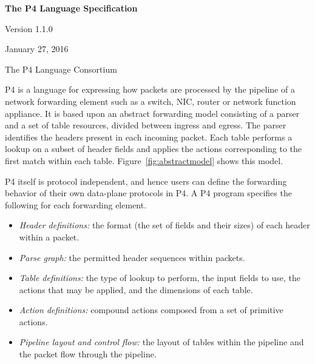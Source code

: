 \documentclass[12pt]{article}
\begin{document}
\vspace{2cm}

\centerline{\sffamily\bfseries\huge The P4 Language Specification}
\vspace{3mm}
\centerline{\sffamily\Large Version 1.1.0}
\vspace{3mm}
\centerline{\sffamily\large January 27, 2016}
\vspace{8mm}
\centerline{\sffamily\large The P4 Language Consortium}

\date{January 27, 2016}
\thispagestyle{firstpagestyle}
\newpage

\tableofcontents
\newpage


P4 is a language for expressing how packets are processed by the 
pipeline of a network forwarding element such as a switch, NIC, router or 
network function appliance. It is based upon an abstract forwarding model 
consisting of a parser and a set of \matchaction table resources, divided 
between ingress and egress. The parser identifies the headers present in 
each incoming packet. Each \matchaction table performs a lookup on a subset 
of header fields and applies the actions corresponding to the first match 
within each table. Figure~\ref{fig:abstractmodel} shows this model.

P4 itself is protocol independent, and hence users can define the forwarding
behavior of their own data-plane protocols in P4.
A P4 program specifies the following for each forwarding 
element.

\begin{itemize}
\item
\textit{Header definitions:} the format (the set of fields and their
sizes) of each header within a packet.
\item
\textit{Parse graph:} the permitted header sequences within packets.
\item
\textit{Table definitions:} the type of lookup to perform, the input
fields to use, the actions that may be applied, and the dimensions of
each table.
\item
\textit{Action definitions:} compound actions composed from a set of
primitive actions.
\item
\textit{Pipeline layout and control flow:} the layout of tables within
the pipeline and the packet flow through the pipeline.
\end{itemize}
\end{document}
